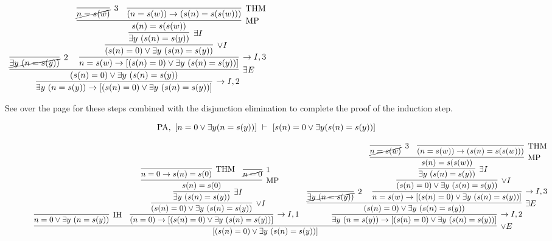 \documentclass[11pt]{report}
\begin{document}
\begin{enumerate}
\begin{enumerate}
		\begin{mdframed}
			\begin{center}
				$\begin{array}{c}
					\infer[\to I,2]{\exists y \ (n=s(y)) \to [(s(n)=0) \lor \exists y \ (s(n)=s(y))]}
								{\infer[\exists E]{(s(n)=0) \lor \exists y \ (s(n)=s(y))}
									{\infer[2]{\cancel{\exists y \ (n=s(y))}}{}
									&
									\infer[\to I,3]{n=s(w) \to [(s(n)=0) \lor \exists y \ (s(n)=s(y))]}
										{\infer[\lor I]{(s(n)=0) \lor \exists y \ (s(n)=s(y))}
											{\infer[\exists I]{\exists y \ (s(n)=s(y))}
												{\infer[\MP]{s(n)=s(s(w))}
													{\infer[3]{\cancel{n=s(w)}}{}
													&
													\infer[\THM]{(n=s(w)) \to (s(n)=s(s(w)))}
														{}
													}}}}}}
				\end{array}$
			\end{center}
		\end{mdframed}

		See over the page for these steps combined with the disjunction elimination to complete the proof of the induction step. 
		
		\begin{figure}

			$$ \text{PA}, \ [n = 0 \lor \exists y (n = s(y))] \ \vdash \ [s(n) = 0 \lor \exists y (s(n) = s(y))]$$

			\begin{mdframed}
				\begin{center}
					\small{$\begin{array}{c}
						\infer[\lor E]{[(s(n)=0) \lor \exists y \ (s(n)=s(y))]}
							{\infer[\IH]{n=0 \lor \exists y \ (n = s(y))}{}
							&
							\infer[\to I,1]{(n=0) \to [(s(n)=0) \lor \exists y \ (s(n)=s(y))]}
								{\infer[\lor I]{(s(n)=0) \lor \exists y \ (s(n)=s(y))}
									{\infer[\exists I]{\exists y \ (s(n)=s(y))}
										{\infer[\MP]{s(n)=s(0)}
											{\infer[\THM]{n=0 \to s(n)=s(0)}{}
											&
											\infer[1]{\cancel{n=0}}{}}}}}
							&
							\infer[\to I,2]{\exists y \ (n=s(y)) \to [(s(n)=0) \lor \exists y \ (s(n)=s(y))]}
								{\infer[\exists E]{(s(n)=0) \lor \exists y \ (s(n)=s(y))}
									{\infer[2]{\cancel{\exists y \ (n=s(y))}}{}
									&
									\infer[\to I,3]{n=s(w) \to [(s(n)=0) \lor \exists y \ (s(n)=s(y))]}
										{\infer[\lor I]{(s(n)=0) \lor \exists y \ (s(n)=s(y))}
											{\infer[\exists I]{\exists y \ (s(n)=s(y))}
												{\infer[\MP]{s(n)=s(s(w))}
													{\infer[3]{\cancel{n=s(w)}}{}
													&
													\infer[\THM]{(n=s(w)) \to (s(n)=s(s(w)))}
														{}
													}}}}}}}
					\end{array}$}
				\end{center}
			\end{mdframed}
		\end{figure}		
		

\end{enumerate}
\end{enumerate}
\end{document}

